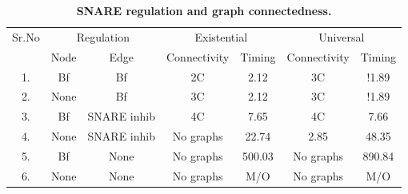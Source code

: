 \begin{table}[t]
	\centering
	\caption{{\bf SNARE regulation and graph connectedness.}}
		\begin{tabular}[t]{|c|c|c|c|c|c|c|}\hline
			
			{\multirow{2}{*} {Sr.No}}  & \multicolumn{2}{c|}{Regulation} & \multicolumn{2}{c|}{Existential} & \multicolumn{2}{c|}{Universal} 
			
			

			
			\\\cline{2-7}
			{} & {Node} & {Edge} & {Connectivity} & {Timing} & {Connectivity} & {Timing}
			
			\\\hline
			1. & Bf & Bf & 2C & 2.12 & 3C & \cellcolor{red!25}!1.89  \\\hline
			2. & None & Bf & 3C & 2.12 & 3C & \cellcolor{red!25}!1.89  \\\hline
			3. & Bf & SNARE inhib & 4C & 7.65 & 4C & 7.66 \\\hline
			4. & None & SNARE inhib & No graphs & 22.74 & 2.85 & 48.35 \\\hline
			5. & Bf & None & No graphs & 500.03 & No graphs & 890.84 \\\hline
			6. &  None & None & No graphs  & M/O & No graphs & M/O \\\hline
			
	\end{tabular}
	\label{tab:satqbf-graph}
\end{table}